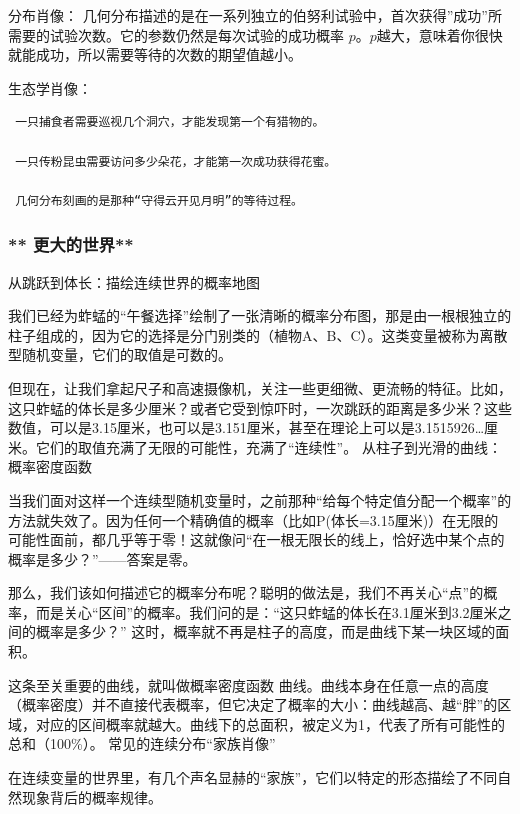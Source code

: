 \documentclass[
]{book}
\begin{document}
\begin{enumerate}
  分布肖像： 几何分布描述的是在一系列独立的伯努利试验中，首次获得''成功''所需要的试验次数。它的参数仍然是每次试验的成功概率 \(p\)。\(p\)越大，意味着你很快就能成功，所以需要等待的次数的期望值越小。

  生态学肖像：

\begin{verbatim}
 一只捕食者需要巡视几个洞穴，才能发现第一个有猎物的。

 一只传粉昆虫需要访问多少朵花，才能第一次成功获得花蜜。

 几何分布刻画的是那种“守得云开见月明”的等待过程。
\end{verbatim}
\end{enumerate}

\hypertarget{ux66f4ux5927ux7684ux4e16ux754c}{%
\subsubsection{** 更大的世界**}\label{ux66f4ux5927ux7684ux4e16ux754c}}

从跳跃到体长：描绘连续世界的概率地图

我们已经为蚱蜢的``午餐选择''绘制了一张清晰的概率分布图，那是由一根根独立的柱子组成的，因为它的选择是分门别类的（植物A、B、C）。这类变量被称为离散型随机变量，它们的取值是可数的。

但现在，让我们拿起尺子和高速摄像机，关注一些更细微、更流畅的特征。比如，这只蚱蜢的体长是多少厘米？或者它受到惊吓时，一次跳跃的距离是多少米？这些数值，可以是3.15厘米，也可以是3.151厘米，甚至在理论上可以是3.1515926\ldots 厘米。它们的取值充满了无限的可能性，充满了``连续性''。
从柱子到光滑的曲线：概率密度函数

当我们面对这样一个连续型随机变量时，之前那种``给每个特定值分配一个概率''的方法就失效了。因为任何一个精确值的概率（比如P(体长=3.15厘米)）在无限的可能性面前，都几乎等于零！这就像问``在一根无限长的线上，恰好选中某个点的概率是多少？''------答案是零。

那么，我们该如何描述它的概率分布呢？聪明的做法是，我们不再关心``点''的概率，而是关心``区间''的概率。我们问的是：``这只蚱蜢的体长在3.1厘米到3.2厘米之间的概率是多少？'' 这时，概率就不再是柱子的高度，而是曲线下某一块区域的面积。

这条至关重要的曲线，就叫做概率密度函数 曲线。曲线本身在任意一点的高度（概率密度）并不直接代表概率，但它决定了概率的大小：曲线越高、越``胖''的区域，对应的区间概率就越大。曲线下的总面积，被定义为1，代表了所有可能性的总和（100\%）。
常见的连续分布``家族肖像''

在连续变量的世界里，有几个声名显赫的``家族''，它们以特定的形态描绘了不同自然现象背后的概率规律。
\end{document}
